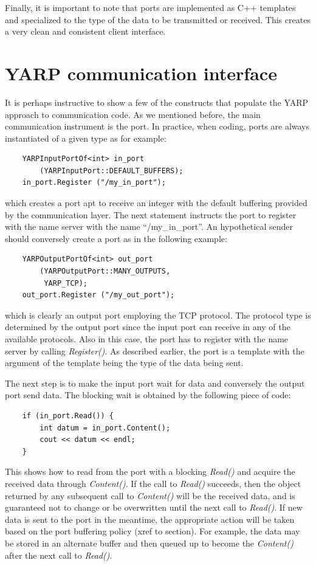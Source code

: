 Finally, it is important to note that ports are implemented as C++ templates and 
specialized to the type of the data to be transmitted or received. This creates a very 
clean and consistent client interface.

\section{YARP communication interface}
It is perhaps instructive to show a few of the constructs that populate the YARP approach
to communication code. As we mentioned before, the main communication instrument is the 
port. In practice, when coding, ports are always instantiated of a given type as for 
example:
%
\begin{verbatim}
    YARPInputPortOf<int> in_port
        (YARPInputPort::DEFAULT_BUFFERS);
    in_port.Register ("/my_in_port");
\end{verbatim}
%
\noindent which creates a port apt to receive an integer with the default buffering
provided by the communication layer. The next statement 
instructs the port to register with the name server with the name ``/my\_in\_port''. An 
hypothetical sender should conversely create a port as in the following example:
%
\begin{verbatim}
    YARPOutputPortOf<int> out_port
        (YARPOutputPort::MANY_OUTPUTS, 
         YARP_TCP);
    out_port.Register ("/my_out_port");
\end{verbatim}
%
\noindent which is clearly an output port employing the TCP protocol. The protocol type
is determined by the output port since the input port can receive in any of the available
protocols. Also in this case, the port has to register with the name server by calling 
{\em Register()}. As described earlier, the port is a template with the argument of the
template being the type of the data being sent.

The next step is to make the input port wait for data and conversely the output port send
data. The blocking wait is obtained by the following piece of code:
%
\begin{verbatim}
    if (in_port.Read()) {
        int datum = in_port.Content();
        cout << datum << endl;
    }
\end{verbatim}
%
\noindent 
This shows how to read from the port with a blocking {\em Read()} and
acquire the received data through {\em Content()}. If the call to {\em
Read()} succeeds, then the object returned by any subsequent call to
{\em Content()} will be the received data, and is guaranteed not to
change or be overwritten until the next call to {\em Read()}.
If new data is sent to the port in the meantime, the appropriate
action will be taken based on the port buffering policy (xref to section).  For example,
the data may be stored in an alternate buffer and then queued up to 
become the {\em Content()} after the next call to {\em Read()}.

